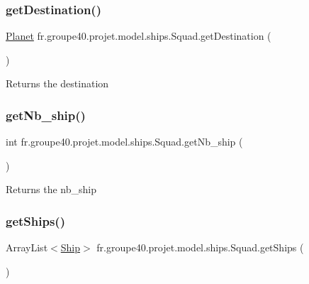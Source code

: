 \subsubsection{\texorpdfstring{get\+Destination()}{getDestination()}}
{\footnotesize\ttfamily \hyperlink{classfr_1_1groupe40_1_1projet_1_1model_1_1planets_1_1_planet}{Planet} fr.\+groupe40.\+projet.\+model.\+ships.\+Squad.\+get\+Destination (\begin{DoxyParamCaption}{ }\end{DoxyParamCaption})}

\begin{DoxyReturn}{Returns}
the destination 
\end{DoxyReturn}
\mbox{\label{classfr_1_1groupe40_1_1projet_1_1model_1_1ships_1_1_squad_a7f03812afcb6e3af4cfd589d2557d0ee}} 
\subsubsection{\texorpdfstring{get\+Nb\+\_\+ship()}{getNb\_ship()}}
{\footnotesize\ttfamily int fr.\+groupe40.\+projet.\+model.\+ships.\+Squad.\+get\+Nb\+\_\+ship (\begin{DoxyParamCaption}{ }\end{DoxyParamCaption})}

\begin{DoxyReturn}{Returns}
the nb\+\_\+ship 
\end{DoxyReturn}
\mbox{\label{classfr_1_1groupe40_1_1projet_1_1model_1_1ships_1_1_squad_a1f5eb0f3d75a52d9f9aeb356eedf603f}} 
\subsubsection{\texorpdfstring{get\+Ships()}{getShips()}}
{\footnotesize\ttfamily Array\+List$<$\hyperlink{classfr_1_1groupe40_1_1projet_1_1model_1_1ships_1_1_ship}{Ship}$>$ fr.\+groupe40.\+projet.\+model.\+ships.\+Squad.\+get\+Ships (\begin{DoxyParamCaption}{ }\end{DoxyParamCaption})}

